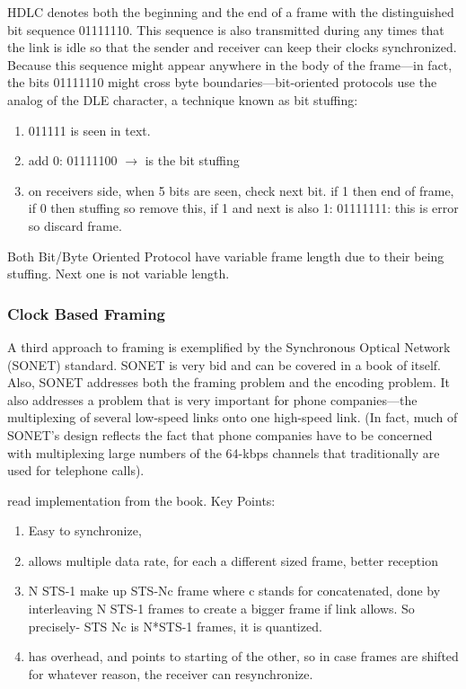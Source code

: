 \documentclass[11pt, a4paper]{article}
\begin{document}
HDLC denotes both the beginning and the end of a frame with the distinguished bit sequence 01111110. This sequence is also transmitted during any times that the link is idle so that the sender and receiver can keep their clocks synchronized. Because this sequence might appear anywhere in the body of the frame—in fact, the bits 01111110 might cross byte boundaries—bit-oriented protocols use the analog of the DLE character, a technique known as bit stuffing: \begin{enumerate}
    \item 011111 is seen in text.
    \item add 0: 01111100 $\to$ is the bit stuffing
    \item on receivers side, when 5 bits are seen, check next bit. if 1 then end of frame, if 0 then stuffing so remove this, if 1 and next is also 1: 01111111: this is error so discard frame.
\end{enumerate}

Both Bit/Byte Oriented Protocol have variable frame length due to their being stuffing. Next one is not variable length.

\subsubsection{Clock Based Framing}
A third approach to framing is exemplified by the Synchronous Optical Network (SONET) standard. SONET is very bid and can be covered in a book of itself. Also, SONET addresses both the framing problem and the encoding problem. It also addresses a problem that is very important for phone companies—the multiplexing of several low-speed links onto one high-speed link. (In fact, much of SONET’s design reflects the fact that phone companies have to be concerned with multiplexing large numbers of the 64-kbps channels that traditionally are used for telephone calls).

read implementation from the book.
Key Points:
\begin{enumerate}
    \item Easy to synchronize,
    \item allows multiple data rate, for each a different sized frame, better reception
    \item N STS-1 make up STS-Nc frame where c stands for concatenated, done by interleaving N STS-1 frames to create a bigger frame if link allows. So precisely- STS Nc is N*STS-1 frames, it is quantized.
    \item has overhead, and points to starting of the other, so in case frames are shifted for whatever reason, the receiver can resynchronize.
\end{enumerate}
\end{document}
